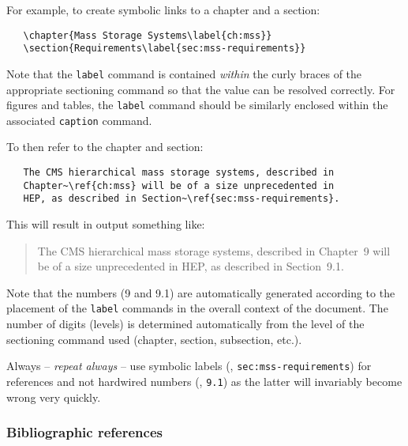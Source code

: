 For example, to create symbolic links to a chapter
and a section:
%
\vspace*{-2.5ex}\begin{verbatim}
   \chapter{Mass Storage Systems\label{ch:mss}}
   \section{Requirements\label{sec:mss-requirements}}
\end{verbatim}
%
Note that the \texttt{label} command is contained \emph{within} the
curly braces of the appropriate sectioning command so that
the value can be resolved correctly.
For figures and tables, the \texttt{label} command should be
similarly enclosed within the associated \texttt{caption} command.

To then refer to the chapter and section:
\vspace*{-2.5ex}\begin{verbatim}
   The CMS hierarchical mass storage systems, described in
   Chapter~\ref{ch:mss} will be of a size unprecedented in
   HEP, as described in Section~\ref{sec:mss-requirements}.
\end{verbatim}

This will result in output something like:
\begin{quote}
   The CMS hierarchical mass storage systems, described in
   Chapter~9 will be of a size unprecedented in
   HEP, as described in Section~9.1.
\end{quote}
%
Note that the numbers (9 and 9.1) are automatically generated
according to the placement of the \texttt{label} commands
in the overall context of the document.
The number of digits (levels) is determined automatically from
the level of the sectioning command used (chapter, section,
subsection, etc.).

Always -- \emph{repeat always} -- use symbolic labels
(\eg, \texttt{sec:mss-requirements})
for references and not hardwired numbers
(\eg, \texttt{9.1})
as the latter will invariably become wrong very quickly.




\subsubsection{Bibliographic references}

